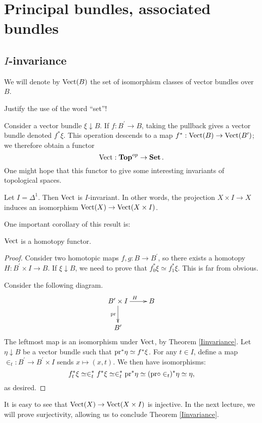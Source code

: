 \section{Principal bundles, associated bundles}
\subsection{$I$-invariance}
We will denote by $\operatorname{Vect}(B)$ the set of isomorphism classes of vector bundles
over $B$. 
\begin{exercise}
Justify the use of the word ``set''!
\end{exercise}

Consider a vector bundle $\xi\downarrow B$. If $f:B^\prime\to B$, taking the
pullback gives a vector bundle denoted $f^\ast\xi$. This operation descends to
a map $f^\ast:\operatorname{Vect}(B)\to \operatorname{Vect}(B^\prime)$; we therefore obtain a functor
\[
\operatorname{Vect}:\mathbf{Top}^{op}\to \mathbf{Set}\,.
\] 
One might hope that this functor to give some
interesting invariants of topological spaces.
\begin{theorem}\label{Iinvariance}
    Let $I = \Delta^1$. Then $\operatorname{Vect}$ is $I$-invariant. In other words, the
    projection $X\times I\to X$ induces an isomorphism $\operatorname{Vect}(X)\to
    \operatorname{Vect}(X\times I)$.
\end{theorem}
One important corollary of this result is:
\begin{corollary}
    $\operatorname{Vect}$ is a homotopy functor.
\end{corollary}
\begin{proof}
    Consider two homotopic maps $f,g:B\to B^\prime$, so there exists a homotopy
    $H:B^\prime\times I\to B$. If $\xi\downarrow B$, we need to prove that
    $f^\ast_0\xi\simeq f_1^\ast\xi$. This is far from obvious.

    Consider the following diagram.
    \begin{equation*}
	\xymatrix{
	    B^\prime\times I\ar[r]^H\ar[d]_{\pr} & B\\
	    B^\prime & 
	    }
    \end{equation*}
    The leftmost map is an isomorphism under $\operatorname{Vect}$, by Theorem
    \ref{Iinvariance}. Let $\eta\downarrow B$ be a vector bundle such that
    $\mathrm{pr}^\ast\eta \simeq f^\ast\xi$. For any $t\in I$, define a map
    $\in_t:B^\prime\to B^\prime\times I$ sends $x\mapsto(x,t)$. We then have
    isomorphisms:
    $$f_t^\ast\xi \simeq \in_t^\ast f^\ast\xi \simeq \in_t^\ast \mathrm{pr}^\ast\eta
    \simeq (\mathrm{pr}\circ \in_t)^\ast\eta \simeq \eta,$$
    as desired.
\end{proof}
It is easy to see that $\operatorname{Vect}(X)\to \operatorname{Vect}(X\times I)$ is injective. In the next
lecture, we will prove surjectivity, allowing us to conclude Theorem
\ref{Iinvariance}.
